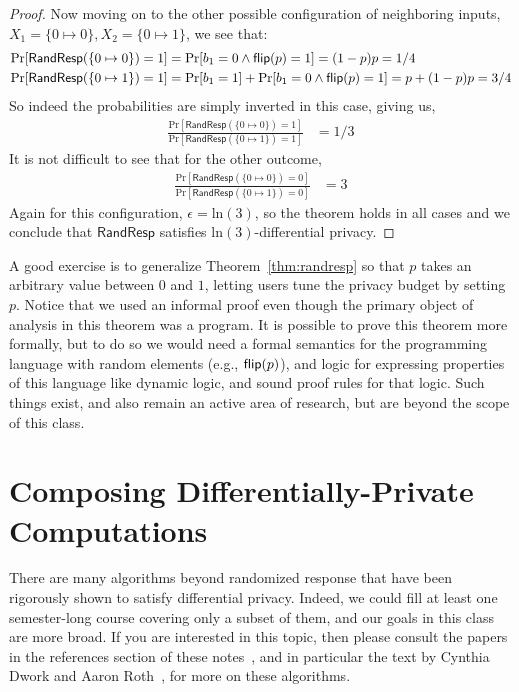\documentclass[11pt,twoside]{scrartcl}
\begin{document}
\begin{proof}
Now moving on to the other possible configuration of neighboring inputs, $X_1 = \{0 \mapsto 0\}, X_2 = \{0 \mapsto 1\}$, we see that:
\begin{align*}
\mathrm{Pr}[\mathsf{RandResp}(\{0 \mapsto 0\}) = 1] &= \mathrm{Pr}[b_1 = 0 \land \mathsf{flip}(p) = 1] = (1-p)p  = 1/4 \\
\mathrm{Pr}[\mathsf{RandResp}(\{0 \mapsto 1\}) = 1] &= \mathrm{Pr}[b_1 = 1] + \mathrm{Pr}[b_1 = 0 \land \mathsf{flip}(p) = 1] = p + (1-p)p  = 3/4
\end{align*}
So indeed the probabilities are simply inverted in this case, giving us,
\begin{align*}
\frac{\mathrm{Pr}[\mathsf{RandResp}(\{0 \mapsto 0\}) = 1]}{\mathrm{Pr}[\mathsf{RandResp}(\{0 \mapsto 1\}) = 1]} &=
1/3
\end{align*}
It is not difficult to see that for the other outcome,
\begin{align*}
\frac{\mathrm{Pr}[\mathsf{RandResp}(\{0 \mapsto 0\}) = 0]}{\mathrm{Pr}[\mathsf{RandResp}(\{0 \mapsto 1\}) = 0]} &=
3
\end{align*}
Again for this configuration, $\epsilon = \mathrm{ln}(3)$, so the theorem holds in all cases and we conclude that $\mathsf{RandResp}$ satisfies $\mathrm{ln}(3)$-differential privacy.
\end{proof}

A good exercise is to generalize Theorem~\ref{thm:randresp} so that $p$ takes an arbitrary value between $0$ and $1$, letting users tune the privacy budget by setting $p$. Notice that we used an informal proof even though the primary object of analysis in this theorem was a program. It is possible to prove this theorem more formally, but to do so we would need a formal semantics for the programming language with random elements (e.g., $\mathsf{flip}(p)$), and logic for expressing properties of this language like dynamic logic, and sound proof rules for that logic. Such things exist, and also remain an active area of research, but are beyond the scope of this class.

\section{Composing Differentially-Private Computations}

There are many algorithms beyond randomized response that have been rigorously shown to satisfy differential privacy. Indeed, we could fill at least one semester-long course covering only a subset of them, and our goals in this class are more broad. If you are interested in this topic, then please consult the papers in the references section of these notes~\cite{Chaudhuri2011,ErlingssonKP14,McSherry2009}, and in particular the text by Cynthia Dwork and Aaron Roth~\cite{Dwork2014}, for more on these algorithms.
\end{document}
